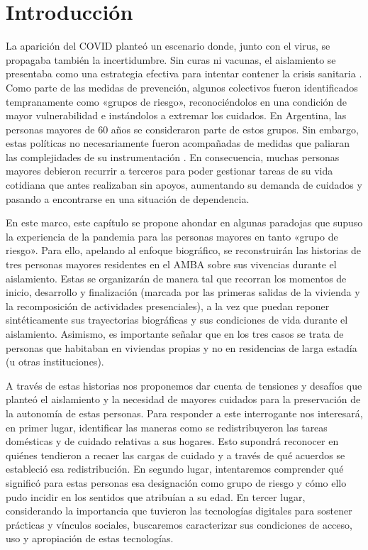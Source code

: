
\begin{refsection}

\label{cap-30}


\section[Introducción]{Introducción}
\label{cap-30.introduccion}
La aparición del COVID planteó un escenario donde, junto con el virus, se propagaba también la incertidumbre. Sin curas ni vacunas, el aislamiento se presentaba como una estrategia efectiva para intentar contener la crisis sanitaria \protect\parencite{4205-HEID2021}. Como parte de las medidas de prevención, algunos colectivos fueron identificados tempranamente como «grupos de riesgo», reconociéndolos en una condición de mayor vulnerabilidad e instándolos a extremar los cuidados. En Argentina, las personas mayores de 60 años se consideraron parte de estos grupos. Sin embargo, estas políticas no necesariamente fueron acompañadas de medidas que paliaran las complejidades de su instrumentación \protect\parencite{4211-CIRINO2022}. En consecuencia, muchas personas mayores debieron recurrir a terceros para poder gestionar tareas de su vida cotidiana que antes realizaban sin apoyos, aumentando su demanda de cuidados y pasando a encontrarse en una situación de dependencia.

En este marco, este capítulo se propone ahondar en algunas paradojas que supuso la experiencia de la pandemia para las personas mayores en tanto «grupo de riesgo». Para ello, apelando al enfoque biográfico, se reconstruirán las historias de tres personas mayores residentes en el AMBA sobre sus vivencias durante el aislamiento. Estas se organizarán de manera tal que recorran los momentos de inicio, desarrollo y finalización (marcada por las primeras salidas de la vivienda y la recomposición de actividades presenciales), a la vez que puedan reponer sintéticamente sus trayectorias biográficas y sus condiciones de vida durante el aislamiento. Asimismo, es importante señalar que en los tres casos se trata de personas que habitaban en viviendas propias y no en residencias de larga estadía (u otras instituciones).

A través de estas historias nos proponemos dar cuenta de tensiones y desafíos que planteó el aislamiento y la necesidad de mayores cuidados para la preservación de la autonomía de estas personas. Para responder a este interrogante nos interesará, en primer lugar, identificar las maneras como se redistribuyeron las tareas domésticas y de cuidado relativas a sus hogares. Esto supondrá reconocer en quiénes tendieron a recaer las cargas de cuidado y a través de qué acuerdos se estableció esa redistribución. En segundo lugar, intentaremos comprender qué significó para estas personas esa designación como grupo de riesgo y cómo ello pudo incidir en los sentidos que atribuían a su edad. En tercer lugar, considerando la importancia que tuvieron las tecnologías digitales para sostener prácticas y vínculos sociales, buscaremos caracterizar sus condiciones de acceso, uso y apropiación de estas tecnologías.


\end{refsection}
